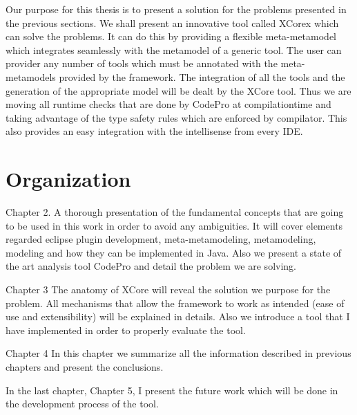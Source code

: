 	Our purpose for this thesis is to present a solution for the problems presented
in the previous sections.  We shall present an innovative tool
called XCorex which can solve the problems. It can do this by providing a flexible
meta-metamodel which integrates seamlessly with the metamodel of a generic
tool. The user can provider any number of tools which must be annotated with the
meta-metamodels provided by the framework. The integration of all the tools and
the generation of the appropriate model will be dealt by the XCore tool. Thus we
are moving all runtime checks that are done by CodePro at compilationtime and
taking advantage of the type safety rules which are enforced by compilator. 
This also provides an easy integration with the intellisense from every IDE.

	
	


\section {Organization}
	Chapter 2.  A thorough presentation of the fundamental concepts that are going
to be used in this work in order to avoid any ambiguities.	It will cover
elements regarded eclipse plugin development, meta-metamodeling, metamodeling,
modeling and how they can be implemented in Java. Also we present a state of the
art analysis tool CodePro and detail the problem we are solving.

	Chapter 3  The anatomy of XCore will reveal the solution we purpose for the 
problem. All mechanisms that allow the framework to work as intended (ease of
use and extensibility) will be explained in details.  Also we introduce a tool
that I have implemented in order to properly evaluate the tool.
	
	Chapter 4  In this chapter we summarize all the information described in
previous chapters and present the conclusions.
	
	In the last chapter, Chapter 5, I present the future work which will be done
in the development process of the tool.	
	